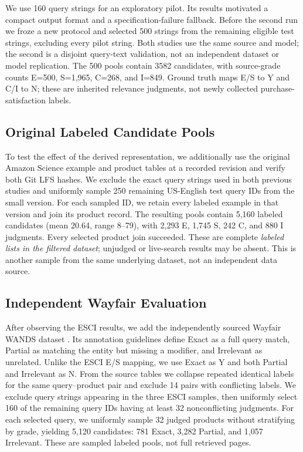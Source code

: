 \documentclass[conference]{IEEEtran}
\begin{document}
We use 160 query strings for an exploratory pilot. Its results motivated a compact output format and a specification-failure fallback. Before the second run we froze a new protocol and selected 500 strings from the remaining eligible test strings, excluding every pilot string. Both studies use the same source and model; the second is a disjoint query-text validation, not an independent dataset or model replication. The 500 pools contain 3582 candidates, with source-grade counts E=500, S=1,965, C=268, and I=849. Ground truth maps E/S to Y and C/I to N; these are inherited relevance judgments, not newly collected purchase-satisfaction labels.

\subsection{Original Labeled Candidate Pools}
To test the effect of the derived representation, we additionally use the original Amazon Science example and product tables at a recorded revision and verify both Git LFS hashes. We exclude the exact query strings used in both previous studies and uniformly sample 250 remaining US-English test query IDs from the small version. For each sampled ID, we retain every labeled example in that version and join its product record. The resulting pools contain 5,160 labeled candidates (mean 20.64, range 8--79), with 2,293 E, 1,745 S, 242 C, and 880 I judgments. Every selected product join succeeded. These are complete \emph{labeled lists in the filtered dataset}; unjudged or live-search results may be absent. This is another sample from the same underlying dataset, not an independent data source.

\subsection{Independent Wayfair Evaluation}
After observing the ESCI results, we add the independently sourced Wayfair WANDS dataset \cite{wands}. Its annotation guidelines define Exact as a full query match, Partial as matching the entity but missing a modifier, and Irrelevant as unrelated. Unlike the ESCI E/S mapping, we use Exact as Y and both Partial and Irrelevant as N. From the source tables we collapse repeated identical labels for the same query--product pair and exclude 14 pairs with conflicting labels. We exclude query strings appearing in the three ESCI samples, then uniformly select 160 of the remaining query IDs having at least 32 nonconflicting judgments. For each selected query, we uniformly sample 32 judged products without stratifying by grade, yielding 5,120 candidates: 781 Exact, 3,282 Partial, and 1,057 Irrelevant. These are sampled labeled pools, not full retrieved pages.
\end{document}
